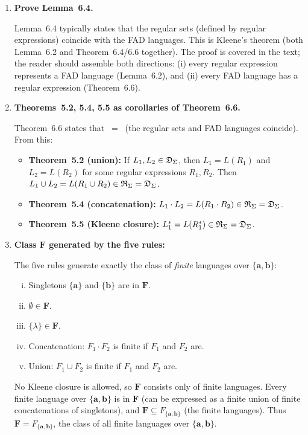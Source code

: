 \begin{enumerate}[{6.}1.]
\item \textbf{Prove Lemma~6.4.}

Lemma~6.4 typically states that the regular sets (defined by regular expressions) coincide with the FAD languages.  This is Kleene's theorem (both Lemma~6.2 and Theorem~6.4/6.6 together).  The proof is covered in the text; the reader should assemble both directions: (i) every regular expression represents a FAD language (Lemma~6.2), and (ii) every FAD language has a regular expression (Theorem~6.6).

\item \textbf{Theorems~5.2, 5.4, 5.5 as corollaries of Theorem~6.6.}

Theorem~6.6 states that \RSIG\ = \DSIG\ (the regular sets and FAD languages coincide).  From this:
\begin{itemize}
  \item \textbf{Theorem~5.2 (union):}  If $L_1,L_2\in\mathfrak{D}_\Sigma$, then $L_1=L(R_1)$ and $L_2=L(R_2)$ for some regular expressions $R_1,R_2$.  Then $L_1\cup L_2=L(R_1\cup R_2)\in\mathfrak{R}_\Sigma=\mathfrak{D}_\Sigma$.
  \item \textbf{Theorem~5.4 (concatenation):}  $L_1\cdot L_2=L(R_1\cdot R_2)\in\mathfrak{R}_\Sigma=\mathfrak{D}_\Sigma$.
  \item \textbf{Theorem~5.5 (Kleene closure):}  $L_1^*=L(R_1^*)\in\mathfrak{R}_\Sigma=\mathfrak{D}_\Sigma$.
\end{itemize}

\item \textbf{Class $\pmb{F}$ generated by the five rules:}

The five rules generate exactly the class of \emph{finite} languages over $\{\pmb{a},\pmb{b}\}$:
\begin{enumerate}[(i)]
  \item Singletons $\{\pmb{a}\}$ and $\{\pmb{b}\}$ are in $\pmb{F}$.
  \item $\emptyset\in\pmb{F}$.
  \item $\{\lambda\}\in\pmb{F}$.
  \item Concatenation: $F_1\cdot F_2$ is finite if $F_1$ and $F_2$ are.
  \item Union: $F_1\cup F_2$ is finite if $F_1$ and $F_2$ are.
\end{enumerate}
No Kleene closure is allowed, so $\pmb{F}$ consists only of finite languages.  Every finite language over $\{\pmb{a},\pmb{b}\}$ is in $\pmb{F}$ (can be expressed as a finite union of finite concatenations of singletons), and $\pmb{F}\subseteq F_{\{\pmb{a},\pmb{b}\}}$ (the finite languages).  Thus $\pmb{F}=F_{\{\pmb{a},\pmb{b}\}}$, the class of all finite languages over $\{\pmb{a},\pmb{b}\}$.

\end{enumerate}
